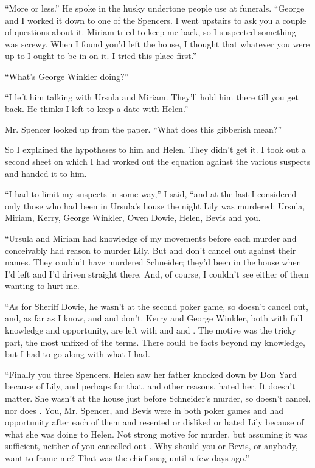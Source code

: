 \documentclass{novel}
\begin{document}
“More or less.” He spoke in the husky undertone people use at funerals. “George and I worked it down to one of the Spencers. I went upstairs to ask you a couple of questions about it. Miriam tried to keep me back, so I suspected something was screwy. When I found you’d left the house, I thought that whatever you were up to I ought to be in on it. I tried this place first.”

“What’s George Winkler doing?”

“I left him talking with Ursula and Miriam. They’ll hold him there till you get back. He thinks I left to keep a date with Helen.”

Mr. Spencer looked up from the paper. “What does this gibberish mean?”

So I explained the hypotheses to him and Helen. They didn’t get it. I took out a second sheet on which I had worked out the equation against the various suspects and handed it to him.

“I had to limit my suspects in some way,” I said, “and at the last I considered only those who had been in Ursula’s house the night Lily was murdered: Ursula, Miriam, Kerry, George Winkler, Owen Dowie, Helen, Bevis and you. 

“Ursula and Miriam had knowledge of my movements before each murder and conceivably had reason to murder Lily. But  and  don’t cancel out against their names. They couldn’t have murdered Schneider; they’d been in the house when I’d left and I’d driven straight there. And, of course, I couldn’t see either of them wanting to hurt me.

“As for Sheriff Dowie, he wasn’t at the second poker game, so  doesn’t cancel out, and, as far as I know,  and  and  don’t. Kerry and George Winkler, both with full knowledge and opportunity, are left with  and  and . The motive was the tricky part, the most unfixed of the terms. There could be facts beyond my knowledge, but I had to go along with what I had.

“Finally you three Spencers. Helen saw her father knocked down by Don Yard because of Lily, and perhaps for that, and other reasons, hated her. It doesn’t matter. She wasn’t at the house just before Schneider’s murder, so  doesn’t cancel, nor does . You, Mr. Spencer, and Bevis were in both poker games and had opportunity after each of them and resented or disliked or hated Lily because of what she was doing to Helen. Not strong motive for murder, but assuming it was sufficient, neither of you cancelled out . Why should you or Bevis, or anybody, want to frame me? That was the chief snag until a few days ago.”
\end{document}
